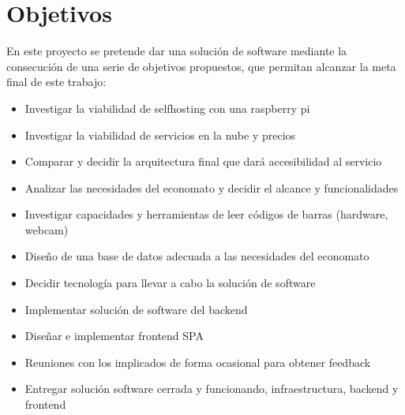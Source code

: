 \section{Objetivos}
En este proyecto se pretende dar una solución de software mediante la consecución de una serie de objetivos propuestos, que permitan alcanzar la meta final de este trabajo:
\begin{itemize}
    \item Investigar la viabilidad de selfhosting con una raspberry pi
    \item Investigar la viabilidad de servicios en la nube y precios
    \item Comparar y decidir la arquitectura final que dará accesibilidad al servicio
    \item Analizar las necesidades del economato y decidir el alcance y funcionalidades
    \item Investigar capacidades y herramientas de leer códigos de barras (hardware, webcam)
    \item Diseño de una base de datos adecuada a las necesidades del economato
    \item Decidir tecnología para llevar a cabo la solución de software
    \item Implementar solución de software del backend
    \item Diseñar e implementar frontend SPA
    \item Reuniones con los implicados de forma ocasional para obtener feedback
    \item Entregar solución software cerrada y funcionando, infraestructura, backend y frontend
\end{itemize}

